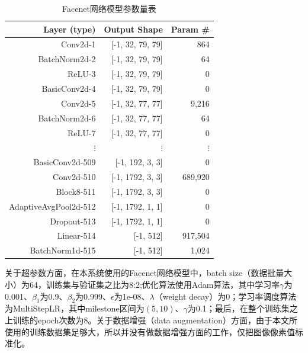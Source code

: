 \begin{table}[H]
    \centering
    \caption{Facenet网络模型参数量表}
    \label{tab:modelparams}
    \begin{tabular}{rrr}
        \toprule
        Layer (type)          & Output Shape     & Param \# \\
        \midrule
        Conv2d-1              & [-1, 32, 79, 79] & 864      \\
        BatchNorm2d-2         & [-1, 32, 79, 79] & 64       \\
        ReLU-3                & [-1, 32, 79, 79] & 0        \\
        BasicConv2d-4         & [-1, 32, 79, 79] & 0        \\
        Conv2d-5              & [-1, 32, 77, 77] & 9,216    \\
        BatchNorm2d-6         & [-1, 32, 77, 77] & 64       \\
        ReLU-7                & [-1, 32, 77, 77] & 0        \\
        $\vdots$              & $\vdots$         & $\vdots$ \\
        BasicConv2d-509       & [-1, 192, 3, 3]  & 0        \\
        Conv2d-510            & [-1, 1792, 3, 3] & 689,920  \\
        Block8-511            & [-1, 1792, 3, 3] & 0        \\
        AdaptiveAvgPool2d-512 & [-1, 1792, 1, 1] & 0        \\
        Dropout-513           & [-1, 1792, 1, 1] & 0        \\
        Linear-514            & [-1, 512]        & 917,504  \\
        BatchNorm1d-515       & [-1, 512]        & 1,024    \\
        \bottomrule
    \end{tabular}
\end{table}

关于超参数方面，在本系统使用的Facenet网络模型中，batch size（数据批量大小）为64，训练集与验证集之比为8:2;优化算法使用Adam算法，其中学习率$\gamma$为0.001、$\beta_{1}$为0.9、$\beta_{2}$为0.999、$\epsilon$为1e-08、$\lambda$（weight decay）为0；学习率调度算法为MultiStepLR，其中milestone区间为$(5,10)$、$\gamma$为0.1；最后，在整个训练集之上训练的epoch次数为8。关于数据增强（data augmentation）方面，由于本文所使用的训练数据集足够大，所以并没有做数据增强方面的工作，仅把图像像素值标准化。

